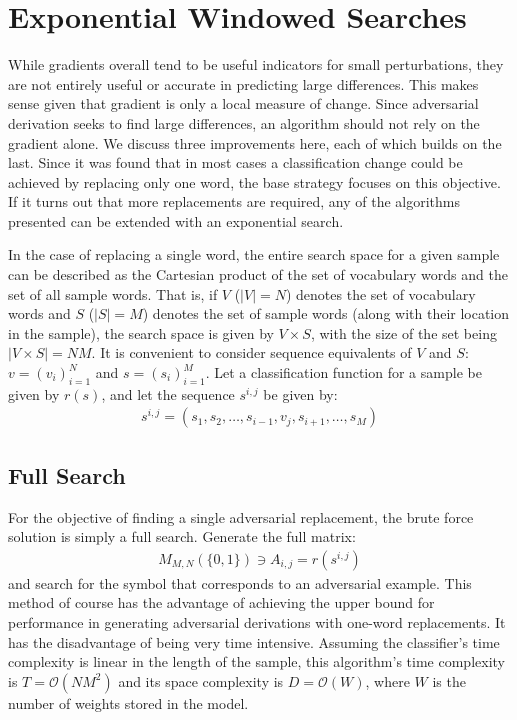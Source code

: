 \chapter{Exponential Windowed Searches}
While gradients overall tend to be useful indicators for small perturbations, they are not entirely useful or accurate in predicting large differences.  This makes sense given that gradient is only a local measure of change.  Since adversarial derivation seeks to find large differences, an algorithm should not rely on the gradient alone.  We discuss three improvements here, each of which builds on the last.  Since it was found that in most cases a classification change could be achieved by replacing only one word, the base strategy focuses on this objective.  If it turns out that more replacements are required, any of the algorithms presented can be extended with an exponential search.

In the case of replacing a single word, the entire search space for a given sample can be described as the Cartesian product of the set of vocabulary words and the set of all sample words.  That is, if $V$ ($|V| = N$) denotes the set of vocabulary words and $S$ ($|S| = M$) denotes the set of sample words (along with their location in the sample), the search space is given by $V\times S$, with the size of the set being $|V\times S| = NM$.  It is convenient to consider sequence equivalents of $V$ and $S$: $v = (v_i)_{i=1}^N$ and $s = (s_i)_{i=1}^M$.  Let a classification function for a sample be given by $r(s)$, and let the sequence $s^{i,j}$ be given by:
\begin{align}\label{eq:replacement_sequence}
s^{i,j} = (s_1,s_2,\dots,s_{i-1},v_j,s_{i+1},\dots,s_M)
\end{align}

\section{Full Search}
For the objective of finding a single adversarial replacement, the brute force solution is simply a full search.  Generate the full matrix: 
\begin{align}\label{eq:class_matrix}
M_{M,N}(\{0,1\}) \ni A_{i,j} = r(s^{i,j})
\end{align}
and search for the symbol that corresponds to an adversarial example.
This method of course has the advantage of achieving the upper bound for performance in generating adversarial derivations with one-word replacements.  It has the disadvantage of being very time intensive.  Assuming the classifier's time complexity is linear in the length of the sample, this algorithm's time complexity is $T=\mathcal{O}(NM^2)$ and its space complexity is $D=\mathcal{O}(W)$, where $W$ is the number of weights stored in the model.

